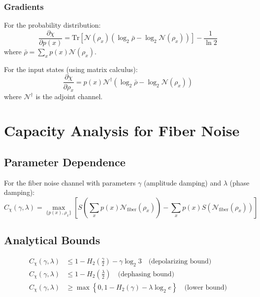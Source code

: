 \documentclass[12pt]{article}
\begin{document}
\subsubsection{Gradients}
For the probability distribution:
\begin{equation}
\frac{\partial \chi}{\partial p(x)} = \text{Tr}\left[ \mathcal{N}(\rho_x) \left( \log_2 \bar{\rho} - \log_2 \mathcal{N}(\rho_x) \right) \right] - \frac{1}{\ln 2}
\label{eq:grad_p}
\end{equation}
where $\bar{\rho} = \sum_x p(x) \mathcal{N}(\rho_x)$.

For the input states (using matrix calculus):
\begin{equation}
\frac{\partial \chi}{\partial \rho_x} = p(x) \mathcal{N}^\dagger\left( \log_2 \bar{\rho} - \log_2 \mathcal{N}(\rho_x) \right)
\label{eq:grad_rho}
\end{equation}
where $\mathcal{N}^\dagger$ is the adjoint channel.

\section{Capacity Analysis for Fiber Noise}

\subsection{Parameter Dependence}
For the fiber noise channel with parameters $\gamma$ (amplitude damping) and $\lambda$ (phase damping):
\[
C_{\chi}(\gamma, \lambda) = \max_{\{p(x), \rho_x\}} \left[ S\left( \sum_x p(x) \mathcal{N}_{\text{fiber}}(\rho_x) \right) - \sum_x p(x) S(\mathcal{N}_{\text{fiber}}(\rho_x)) \right]
\]

\subsection{Analytical Bounds}
\begin{align}
C_{\chi}(\gamma, \lambda) &\leq 1 - H_2\left(\frac{\gamma}{2}\right) - \gamma \log_2 3 \quad \text{(depolarizing bound)} \\
C_{\chi}(\gamma, \lambda) &\leq 1 - H_2\left(\frac{\lambda}{2}\right) \quad \text{(dephasing bound)} \\
C_{\chi}(\gamma, \lambda) &\geq \max\left\{0, 1 - H_2(\gamma) - \lambda \log_2 e\right\} \quad \text{(lower bound)}
\end{align}
\end{document}
